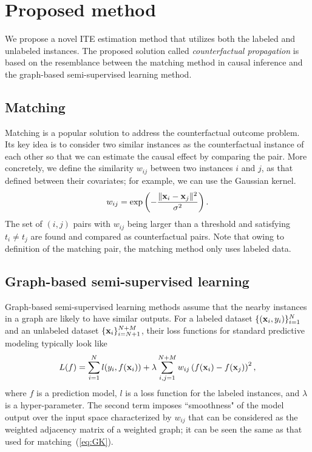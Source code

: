 \section{Proposed method\label{sec:proposed}}
We propose a novel ITE estimation method that utilizes both the labeled and unlabeled instances.
The proposed solution called {\it counterfactual propagation} is based on the resemblance between the matching method in causal inference and the graph-based semi-supervised learning method.
%

\subsection{Matching}
Matching is a popular solution to address the counterfactual outcome problem.
Its key idea is to consider two similar instances as the counterfactual instance of each other so that we can estimate the causal effect by comparing the pair.
More concretely, we define the similarity $w_{ij}$ between two instances $i$ and $j$, as that defined between their covariates; for example, we can use the Gaussian kernel.
\begin{equation}\label{eq:GK}
    w_{ij} = \exp \left(- \frac{\| \mathbf x_i - \mathbf x_j \|^2}{\sigma^2} \right).
\end{equation}
The set of $(i,j)$ pairs with $w_{ij}$ being larger than a threshold and satisfying $t_i \neq t_j$ are found and compared as counterfactual pairs.
%
Note that owing to definition of the matching pair, the matching method only uses labeled data.

\subsection{Graph-based semi-supervised learning}\label{sec:gb}
Graph-based semi-supervised learning methods assume that the nearby instances in a graph are likely to have similar outputs. 
For a labeled dataset $\{(\mathbf x_i, y_i)\}_{i=1}^N$ and an unlabeled dataset $\{\mathbf x_i\}_{i=N+1}^{N+M}$, their loss functions for standard predictive modeling typically look like
\begin{equation}\label{eq:LPreg}
L(f)=\sum_{i=1}^{N}l(y_i, f(\mathbf x_i))+\lambda\sum_{i,j=1}^{N+M}w_{ij}\left(f(\mathbf x_i)-f(\mathbf x_j) \right)^2,
\end{equation}
where $f$ is a prediction model, $l$ is a loss function for the labeled instances, and $\lambda$ is a hyper-parameter.
The second term imposes ``smoothness" of the model output over the input space characterized by $w_{ij}$ that can be considered as the weighted adjacency matrix of a weighted graph; it can be seen the same as that used for matching~(\ref{eq:GK}).

